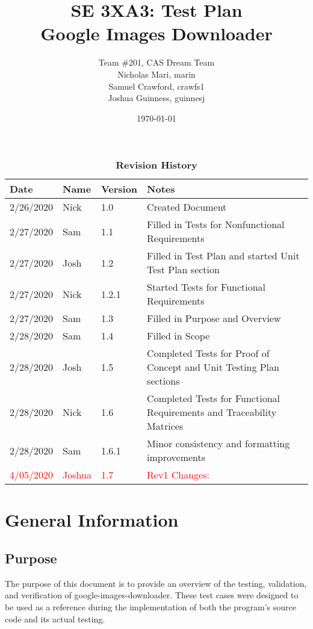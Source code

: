 \documentclass[12pt, titlepage]{article}
\title{SE 3XA3: Test Plan\\Google Images Downloader}
\author{Team \#201, CAS Dream Team
		\\ Nicholas Mari, marin
		\\ Samuel Crawford, crawfs1
		\\ Joshua Guinness, guinnesj
}
\date{\today}
\begin{document}
\maketitle

\tableofcontents
\listoftables

\begin{table}[!b]
\begin{tabularx}{\textwidth}{lllp{7.5cm}}
\toprule {\bf Date} & {\bf Name} & {\bf Version} & {\bf Notes}\\
\midrule
2/26/2020 & Nick & 1.0 & Created Document\\
2/27/2020 & Sam & 1.1 & Filled in Tests for Nonfunctional Requirements\\
2/27/2020 & Josh & 1.2 & Filled in Test Plan and started Unit Test Plan section\\
2/27/2020 & Nick & 1.2.1 & Started Tests for Functional Requirements\\
2/27/2020 & Sam & 1.3 & Filled in Purpose and Overview\\
2/28/2020 & Sam & 1.4 & Filled in Scope\\
2/28/2020 & Josh & 1.5 & Completed Tests for Proof of Concept and Unit Testing Plan sections\\
2/28/2020 & Nick & 1.6 & Completed Tests for Functional Requirements and Traceability Matrices\\
2/28/2020 & Sam & 1.6.1 & Minor consistency and formatting improvements\\
\textcolor{red}{4/05/2020} & \textcolor{red}{Joshua} & \textcolor{red}{1.7} & \textcolor{red}{Rev1 Changes:}\\
\bottomrule
\end{tabularx}
\caption{\bf Revision History}
\end{table}

\newpage


\section{General Information}

\subsection{Purpose}
The purpose of this document is to provide an overview of the testing, validation, and verification of google-images-downloader. These test cases were designed to be used as a reference during the implementation of both the program's source code and its actual testing.
\end{document}

